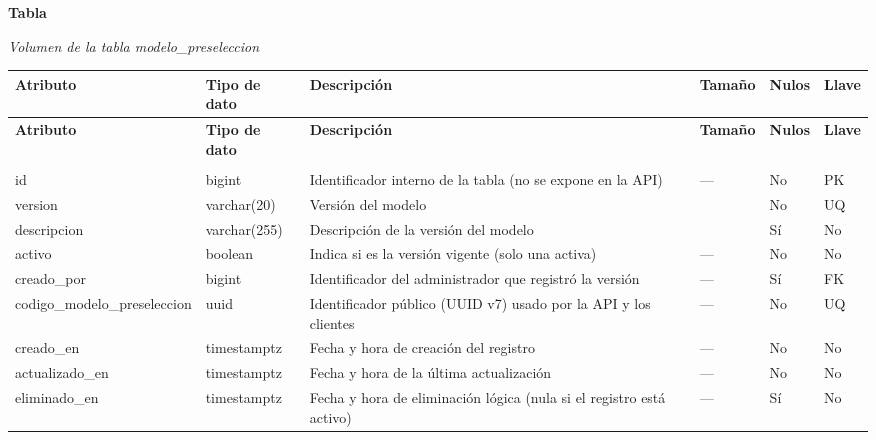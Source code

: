 \label{tab:volumen_modelo_preseleccion}
\noindent\textbf{Tabla~\thetable}\par\nopagebreak
\noindent\textit{Volumen de la tabla modelo\_\allowbreak{}preseleccion}\par\nopagebreak
\begingroup\small\linespread{1}\selectfont\setlength{\tabcolsep}{4pt}
\begin{longtable}{>{\raggedright\arraybackslash}p{3.4cm} >{\raggedright\arraybackslash}p{2.5cm} >{\raggedright\arraybackslash}p{4.8cm} >{\centering\arraybackslash}p{1.6cm}>{\centering\arraybackslash}p{1.1cm} >{\centering\arraybackslash}p{1.3cm}}
\toprule
\textbf{Atributo} & \textbf{Tipo de dato} & \textbf{Descripción} & \textbf{Tamaño} & \textbf{Nulos} & \textbf{Llave} \\
\midrule
\endfirsthead
\toprule
\textbf{Atributo} & \textbf{Tipo de dato} & \textbf{Descripción} & \textbf{Tamaño} & \textbf{Nulos} & \textbf{Llave} \\
\midrule
\endhead
\endfoot
\bottomrule
\multicolumn{6}{l}{\textit{Nota.} Elaboración propia.} \\
\endlastfoot
id & bigint & Identificador interno de la tabla (no se expone en la API) & — & No & PK \\
version & varchar(20) & Versión del modelo & 20 & No & UQ \\
descripcion & varchar(255) & Descripción de la versión del modelo & 255 & Sí & No \\
activo & boolean & Indica si es la versión vigente (solo una activa) & — & No & No \\
creado\_\allowbreak{}por & bigint & Identificador del administrador que registró la versión & — & Sí & FK \\
codigo\_\allowbreak{}modelo\_\allowbreak{}preseleccion & uuid & Identificador público (UUID v7) usado por la API y los clientes & — & No & UQ \\
creado\_\allowbreak{}en & timestamptz & Fecha y hora de creación del registro & — & No & No \\
actualizado\_\allowbreak{}en & timestamptz & Fecha y hora de la última actualización & — & No & No \\
eliminado\_\allowbreak{}en & timestamptz & Fecha y hora de eliminación lógica (nula si el registro está activo) & — & Sí & No \\
\end{longtable}
\endgroup
\addtocounter{table}{-1}

